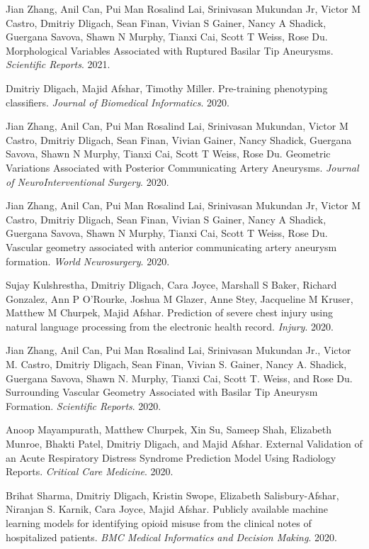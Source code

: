 \documentclass[letterpaper]{article}
\renewenvironment{itemize}{
  \begin{list}{}{
    \setlength{\leftmargin}{1.5em}
  }
}{
  \end{list}
}
\begin{document}
\begin{itemize}
\item Jian Zhang, Anil Can, Pui Man Rosalind Lai, Srinivasan Mukundan Jr, Victor M Castro, Dmitriy Dligach, Sean Finan, Vivian S Gainer, Nancy A Shadick, Guergana Savova, Shawn N Murphy, Tianxi Cai, Scott T Weiss, Rose Du. Morphological Variables Associated with Ruptured Basilar Tip Aneurysms. \emph{Scientific Reports}. 2021.
\item Dmitriy Dligach, Majid Afshar, Timothy Miller. Pre-training phenotyping classifiers. \emph{Journal of Biomedical Informatics}. 2020.
\item Jian Zhang, Anil Can, Pui Man Rosalind Lai, Srinivasan Mukundan, Victor M Castro, Dmitriy Dligach, Sean Finan, Vivian Gainer, Nancy Shadick, Guergana Savova, Shawn N Murphy, Tianxi Cai, Scott T Weiss, Rose Du. Geometric Variations Associated with Posterior Communicating Artery Aneurysms. \emph{Journal of NeuroInterventional Surgery}. 2020.
\item Jian Zhang, Anil Can, Pui Man Rosalind Lai, Srinivasan Mukundan Jr, Victor M Castro, Dmitriy Dligach, Sean Finan, Vivian S Gainer, Nancy A Shadick, Guergana Savova, Shawn N Murphy, Tianxi Cai, Scott T Weiss, Rose Du. Vascular geometry associated with anterior communicating artery aneurysm formation. \emph{World Neurosurgery}. 2020.
\item Sujay Kulshrestha, Dmitriy Dligach, Cara Joyce, Marshall S Baker, Richard Gonzalez, Ann P O'Rourke, Joshua M Glazer, Anne Stey, Jacqueline M Kruser, Matthew M Churpek, Majid Afshar. Prediction of severe chest injury using natural language processing from the electronic health record. \emph{Injury}. 2020.
\item Jian Zhang, Anil Can, Pui Man Rosalind Lai, Srinivasan Mukundan Jr., Victor M. Castro, Dmitriy Dligach, Sean Finan, Vivian S. Gainer, Nancy A. Shadick, Guergana Savova, Shawn N. Murphy, Tianxi Cai, Scott T. Weiss, and Rose Du. Surrounding Vascular Geometry Associated with Basilar Tip Aneurysm Formation. \emph{Scientific Reports}. 2020.
\item Anoop Mayampurath, Matthew Churpek, Xin Su, Sameep Shah, Elizabeth Munroe, Bhakti Patel, Dmitriy Dligach, and Majid Afshar. External Validation of an Acute Respiratory Distress Syndrome Prediction Model Using Radiology Reports. \emph{Critical Care Medicine}. 2020.
\item Brihat Sharma, Dmitriy Dligach, Kristin Swope, Elizabeth Salisbury-Afshar, Niranjan S. Karnik, Cara Joyce, Majid Afshar. Publicly available machine learning models for identifying opioid misuse from the clinical notes of hospitalized patients. \emph{BMC Medical Informatics and Decision Making}. 2020.

\end{itemize}
\end{document}
